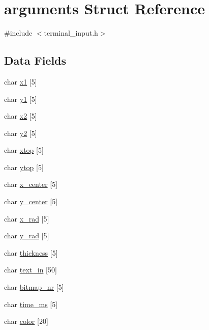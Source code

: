 \hypertarget{structarguments}{}\section{arguments Struct Reference}
\label{structarguments}


{\ttfamily \#include $<$terminal\+\_\+input.\+h$>$}

\subsection*{Data Fields}
\begin{DoxyCompactItemize}
\item 
char \mbox{\hyperlink{structarguments_aa9632112670744101fdbb37c6c3ebada}{x1}} \mbox{[}5\mbox{]}
\item 
char \mbox{\hyperlink{structarguments_a54b39f7f6b77ec275a2ac13cd77adf00}{y1}} \mbox{[}5\mbox{]}
\item 
char \mbox{\hyperlink{structarguments_aaa8214ec50a3ad2fec5efd88e613c486}{x2}} \mbox{[}5\mbox{]}
\item 
char \mbox{\hyperlink{structarguments_a2698dfecef10a6ab81082573cfb12a2f}{y2}} \mbox{[}5\mbox{]}
\item 
char \mbox{\hyperlink{structarguments_a48667ef868b7155b846c52f4ae491aee}{xtop}} \mbox{[}5\mbox{]}
\item 
char \mbox{\hyperlink{structarguments_ac0226270fab7a4cb917f8ba928793562}{ytop}} \mbox{[}5\mbox{]}
\item 
char \mbox{\hyperlink{structarguments_a761e1be227db51ab1850a51b0a23b501}{x\+\_\+center}} \mbox{[}5\mbox{]}
\item 
char \mbox{\hyperlink{structarguments_ae9b7098083bae6eed88458ac05eb1366}{y\+\_\+center}} \mbox{[}5\mbox{]}
\item 
char \mbox{\hyperlink{structarguments_a1e41b0a965e1572da13c9e67858f8f7b}{x\+\_\+rad}} \mbox{[}5\mbox{]}
\item 
char \mbox{\hyperlink{structarguments_a27460aad3986269750518aa7b1e28cc7}{y\+\_\+rad}} \mbox{[}5\mbox{]}
\item 
char \mbox{\hyperlink{structarguments_a7bc9e84bf6152179ba8621f46e851ec2}{thickness}} \mbox{[}5\mbox{]}
\item 
char \mbox{\hyperlink{structarguments_a696b9b4d921b5eb2d4afa8c34e1f444e}{text\+\_\+in}} \mbox{[}50\mbox{]}
\item 
char \mbox{\hyperlink{structarguments_a857518b41cf9da902780b15070c41b92}{bitmap\+\_\+nr}} \mbox{[}5\mbox{]}
\item 
char \mbox{\hyperlink{structarguments_af811b247ca7eaea38fbf7983b61df6dd}{time\+\_\+ms}} \mbox{[}5\mbox{]}
\item 
char \mbox{\hyperlink{structarguments_ab97e9d3ba021a4a0dd226ee1eabe7551}{color}} \mbox{[}20\mbox{]}
\end{DoxyCompactItemize}


